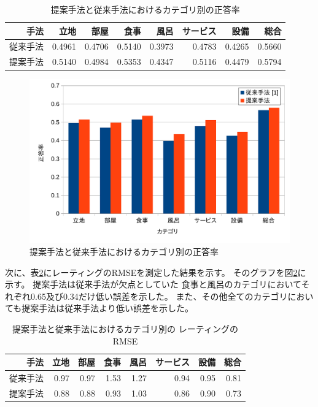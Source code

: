 \begin{table}
  \caption{提案手法と従来手法\cite{fujitani15}におけるカテゴリ別の正答率}
  \centering
  \begin{tabular}{r | r r r r r r r} \label{tab:AccuraciesPerCategory}
    手法 & 立地 & 部屋 & 食事 & 風呂 & サービス & 設備 & 総合 \\
    \hline
    従来手法\cite{fujitani15}
        & 0.4961 & 0.4706 & 0.5140 & 0.3973 & 0.4783 & 0.4265 & 0.5660 \\
    提案手法 & 0.5140 & 0.4984 & 0.5353 & 0.4347 & 0.5116 & 0.4479 & 0.5794 \\
  \end{tabular}
\end{table}

\begin{figure}
  \includegraphics{fig/graph_of_accuracies_per_category.pdf}
  \caption{提案手法と従来手法\cite{fujitani15}におけるカテゴリ別の正答率}
  \label{fig:AccuraciesPerCategory}
\end{figure}

次に、表\ref{tab:RMSEsPerCategory}にレーティングのRMSEを測定した結果を示す。
そのグラフを図\ref{tab:RMSEsPerCategory}に示す。
提案手法は従来手法\cite{fujitani15}が欠点としていた
食事と風呂のカテゴリにおいてそれぞれ0.65及び0.34だけ低い誤差を示した。
また、その他全てのカテゴリにおいても提案手法は従来手法より低い誤差を示した。

\begin{table}
  \caption{提案手法と従来手法\cite{fujitani15}におけるカテゴリ別の
           レーティングのRMSE}
  \centering
  \begin{tabular}{r | r r r r r r r} \label{tab:RMSEsPerCategory}
    手法 & 立地 & 部屋 & 食事 & 風呂 & サービス & 設備 & 総合 \\
    \hline
    従来手法\cite{fujitani15}
        & 0.97 & 0.97 & 1.53 & 1.27 & 0.94 & 0.95 & 0.81 \\
    提案手法 & 0.88 & 0.88 & 0.93 & 1.03 & 0.86 & 0.90 & 0.73 \\
  \end{tabular}
\end{table}

